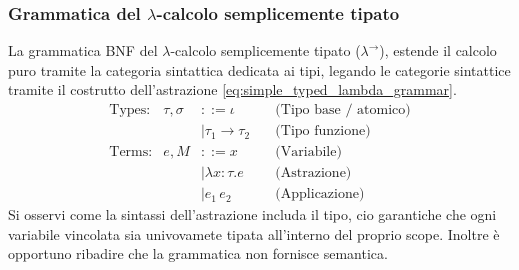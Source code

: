 \subsubsection{Grammatica del \texorpdfstring{$\lambda$}{Lambda}-calcolo semplicemente tipato}
La grammatica BNF del $\lambda$-calcolo semplicemente tipato ($\lambda^{\to}$), estende il calcolo puro tramite
la categoria sintattica dedicata ai tipi, legando le categorie sintattice tramite il costrutto dell'astrazione 
\eqref{eq:simple_typed_lambda_grammar}.
\begin{equation}
    \begin{array}{lrll}
        \text{Types:}   & \tau, \sigma & ::= \iota \quad                & \text{(Tipo base / atomico)}      \\
                        &              & \mid \tau_1 \to \tau_2 \quad   & \text{(Tipo funzione)}            \\
        \text{Terms:}   & e, M         & ::= x \quad                    & \text{(Variabile)}                \\
                        &              & \mid \lambda x : \tau . e \quad& \text{(Astrazione)}               \\
                        &              & \mid e_1 \, e_2 \quad          & \text{(Applicazione)}
    \end{array}
    \tag{STLC}
    \label{eq:simple_typed_lambda_grammar}
\end{equation}
Si osservi come la sintassi dell'astrazione includa il tipo, cio garantiche che ogni variabile vincolata sia univovamete tipata 
all'interno del proprio scope. Inoltre è opportuno ribadire che la grammatica non fornisce semantica.

